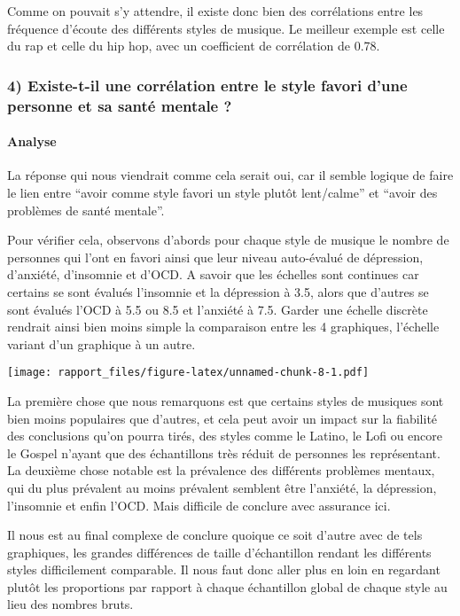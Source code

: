 \documentclass[
]{article}
\begin{document}
Comme on pouvait s'y attendre, il existe donc bien des corrélations
entre les fréquence d'écoute des différents styles de musique. Le
meilleur exemple est celle du rap et celle du hip hop, avec un
coefficient de corrélation de 0.78.

\subsubsection{4) Existe-t-il une corrélation entre le style favori
d'une personne et sa santé mentale
?}\label{existe-t-il-une-corruxe9lation-entre-le-style-favori-dune-personne-et-sa-santuxe9-mentale}

\paragraph{\texorpdfstring{\textbf{Analyse}}{Analyse}}\label{analyse-4}

La réponse qui nous viendrait comme cela serait oui, car il semble
logique de faire le lien entre ``avoir comme style favori un style
plutôt lent/calme'' et ``avoir des problèmes de santé mentale''.

Pour vérifier cela, observons d'abords pour chaque style de musique le
nombre de personnes qui l'ont en favori ainsi que leur niveau
auto-évalué de dépression, d'anxiété, d'insomnie et d'OCD. A savoir que
les échelles sont continues car certains se sont évalués l'insomnie et
la dépression à 3.5, alors que d'autres se sont évalués l'OCD à 5.5 ou
8.5 et l'anxiété à 7.5. Garder une échelle discrète rendrait ainsi bien
moins simple la comparaison entre les 4 graphiques, l'échelle variant
d'un graphique à un autre.

\texttt{[image: rapport\_files/figure-latex/unnamed-chunk-8-1.pdf]}

La première chose que nous remarquons est que certains styles de
musiques sont bien moins populaires que d'autres, et cela peut avoir un
impact sur la fiabilité des conclusions qu'on pourra tirés, des styles
comme le Latino, le Lofi ou encore le Gospel n'ayant que des
échantillons très réduit de personnes les représentant. La deuxième
chose notable est la prévalence des différents problèmes mentaux, qui du
plus prévalent au moins prévalent semblent être l'anxiété, la
dépression, l'insomnie et enfin l'OCD. Mais difficile de conclure avec
assurance ici.

Il nous est au final complexe de conclure quoique ce soit d'autre avec
de tels graphiques, les grandes différences de taille d'échantillon
rendant les différents styles difficilement comparable. Il nous faut
donc aller plus en loin en regardant plutôt les proportions par rapport
à chaque échantillon global de chaque style au lieu des nombres bruts.
\end{document}
